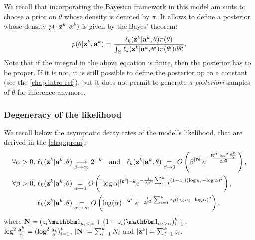 We recall that incorporating the Bayesian framework in this model amounts to choose a prior on $\theta$ whose density is denoted by $\pi$.
It allows to define a posterior whose density $p(\cdot|\mathbf{z}^k,\mathbf{a}^k)$ is given by the Bayes' theorem:
\begin{equation}\label{eq:constr-frag:posterior}
    p(\theta|\mathbf{z}^k,\mathbf{a}^k) = \frac{\ell_k(\mathbf{z}^k|\mathbf{a}^k,\theta)\pi(\theta)}{\int_{\Theta}\ell_k(\mathbf{z}^k|\mathbf{a}^k,\theta')\pi(\theta')d\theta'}.
\end{equation}
Note that if the integral in the above equation is finite, then the posterior has to be proper. If it is not, it is still possible to define the posterior up to a constant (see the \cref{chap:intro-ref}), but it does not permit to generate \emph{a posteriori} samples of $\theta$ for inference anymore.




\subsubsection{Degeneracy of the likelihood}

We recall below the asymptotic decay rates of the model's likelihood, that are derived in the \cref{chap:prem}:
\begin{align}
    \forall\alpha>0,\, \ell_k(\mathbf{z}^k|\mathbf{a}^k,\theta) &\overset{\ }{\underset{\beta\rightarrow\infty}{\longrightarrow}}2^{-k}\quad\text{and}\quad
        \ell_k(\mathbf{z}^k|\mathbf{a}^k,\theta) \overset{}{\underset{\beta\rightarrow0}{=}}O\left(\beta^{|\mathbf{N}|}e^{-\frac{\mathbf{N}^T\log^2\frac{\mathbf{a}^k}{\alpha}}{2\beta^2}}\right) ,\\
    \forall\beta>0,\, \ell_k(\mathbf{z}^k|\mathbf{a}^k,\theta)  &\overset{}{\underset{\alpha\rightarrow0}{=}}  O\left(|\log\alpha|^{|\mathbf{z}^k|-k} e^{-\frac{1}{2\beta^2}\sum_{i=1}^k (1-z_i)(\log a_i-\log\alpha)^2} \right),\\
    \ell_k(\mathbf{z}^k|\mathbf{a}^k,\theta) &\overset{}{\underset{\alpha\rightarrow\infty}{=}}  O\left(\log(\alpha)^{-|\mathbf{z}^k|} e^{-\frac{1}{2\beta^2}\sum_{i=1}^k z_i(\log a_i-\log\alpha)^2} \right) ,
\end{align}
where $\mbf N=(z_i\indic_{a_i<\alpha}+(1-z_i)\indic_{a_i>\alpha})_{i=1}^k$, $\log^2\frac{\mathbf{a}^k}{\alpha}=(\log^2\frac{a_i}{\alpha})_{i=1}^k$, 
    $|\mathbf{N}|=\sum_{i=1}^kN_i$ and
    $|\mathbf{z}^k|=\sum_{i=1}^kz_i$. %

